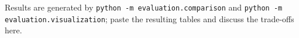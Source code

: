 Results are generated by \texttt{python -m evaluation.comparison} and
\texttt{python -m evaluation.visualization}; paste the resulting tables and discuss the trade-offs here.

